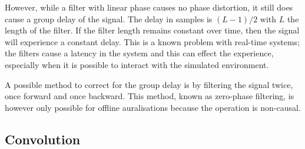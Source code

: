 However, while a filter with linear phase causes no phase distortion, it still 
does cause a group delay of the signal. The delay in samples is $(L-1)/2$ with 
$L$ the length of the filter. If the filter length remains constant over time, 
then the signal will experience a constant delay. This is a known problem with 
real-time systems; the filters cause a latency in the system and this can effect 
the experience, especially when it is possible to interact with the simulated 
environment. 

A possible method to correct for the group delay is by filtering the signal 
twice, once forward and once backward. This method, known as zero-phase 
filtering, is however only possible for offline auralisations because the 
operation is non-causal. 






\newpage
\subsection{Convolution}

